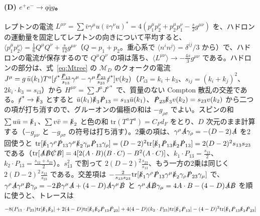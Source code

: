 \documentclass[a4paper,10pt]{ltjsarticle}
\newcommand{\tr}{\mathrm{tr}}
\begin{document}
\paragraph{(D) $e^+e^-\to q\bar qg$。}レプトンの電流 $L^{\mu\nu}=\sum\bar v\gamma^\mu u(\bar v\gamma^\nu u)^*=4(p_1^\mu p_2^\nu+p_2^\mu p_1^\nu-\frac s2g^{\mu\nu})$ を、ハドロンの運動量を固定してレプトンの向きについて平均すると、$\langle p_1^\mu p_2^\nu\rangle=\frac16Q^\mu Q^\nu+\frac{s}{12}g^{\mu\nu}$（$Q=p_1+p_2$。重心系で $\langle n^in^j\rangle=\delta^{ij}/3$ から）で、ハドロンの電流が保存するので $Q^\mu Q^\nu$ の項は落ち、$\langle L^{\mu\nu}\rangle\to-\frac{4s}3g^{\mu\nu}$ である。ハドロンの部分は、式~\eqref{eq:Mtree} の $\mathcal M_D$ のクォークの電流 $J^\mu=g\,\bar u(k_1)T^a[\slashed\varepsilon^*\frac{\slashed P_{13}}{s_{13}}\gamma^\mu-\gamma^\mu\frac{\slashed P_{23}}{s_{23}}\slashed\varepsilon^*]v(k_2)$（$P_{i3}=k_i+k_3$、$s_{ij}=(k_i+k_j)^2$、$2k_i\cdot k_3=s_{i3}$）から $H^{\mu\nu}=\sum J^\mu J^{\nu*}$ で、質量のない Compton 散乱の交差である。$\slashed\varepsilon^*\to\slashed k_3$ とすると $\bar u(k_1)\slashed k_3\slashed P_{13}=s_{13}\bar u(k_1)$、$\slashed P_{23}\slashed k_3v(k_2)=s_{23}v(k_2)$ から二つの項が打ち消すので、グルーオンの偏極の和は $-g_{\rho\sigma}$ でよい。スピンの和 $\sum u\bar u=\slashed k_1$、$\sum v\bar v=\slashed k_2$ と色の和 $\tr(T^aT^a)=C_Fd_F$ をとり、$D$ 次元のまま計算する（$-g_{\mu\nu}$ と $-g_{\rho\sigma}$ の符号は打ち消す）。2乗の項は、$\gamma^\rho\slashed A\gamma_\rho=-(D-2)\slashed A$ を2回使うと $\tr[\slashed k_1\gamma^\rho\slashed P_{13}\gamma^\mu\slashed k_2\gamma_\mu\slashed P_{13}\gamma_\rho]=(D-2)^2\tr[\slashed k_1\slashed P_{13}\slashed k_2\slashed P_{13}]=2(D-2)^2s_{13}s_{23}$ である（$\tr[\slashed A\slashed B\slashed C\slashed B]=4[2(A\cdot B)(B\cdot C)-B^2(A\cdot C)]$、$k_1\cdot P_{13}=\frac{s_{13}}2$、$k_2\cdot P_{13}=\frac{s_{12}+s_{23}}2$）。$s_{13}^2$ で割って $2(D-2)^2\frac{s_{23}}{s_{13}}$、もう一方の2乗は同じく $2(D-2)^2\frac{s_{13}}{s_{23}}$ である。交差項は $-\frac{2}{s_{13}s_{23}}\tr[\slashed k_1\gamma^\rho\slashed P_{13}\gamma^\mu\slashed k_2\gamma_\rho\slashed P_{23}\gamma_\mu]$ で、$\gamma^\rho\slashed A\gamma^\mu\slashed B\gamma_\rho=-2\slashed B\gamma^\mu\slashed A+(4-D)\slashed A\gamma^\mu\slashed B$ と $\gamma^\mu\slashed A\slashed B\gamma_\mu=4A\cdot B-(4-D)\slashed A\slashed B$ を順に使うと、トレースは
\begin{equation*}
-8(P_{13}\cdot P_{23})\tr[\slashed k_1\slashed k_2]+2(4-D)\tr[\slashed k_1\slashed k_2\slashed P_{13}\slashed P_{23}]+4(4-D)(k_2\cdot P_{23})\tr[\slashed k_1\slashed P_{13}]-(4-D)^2\tr[\slashed k_1\slashed P_{13}\slashed k_2\slashed P_{23}]
\end{equation*}
\end{document}
